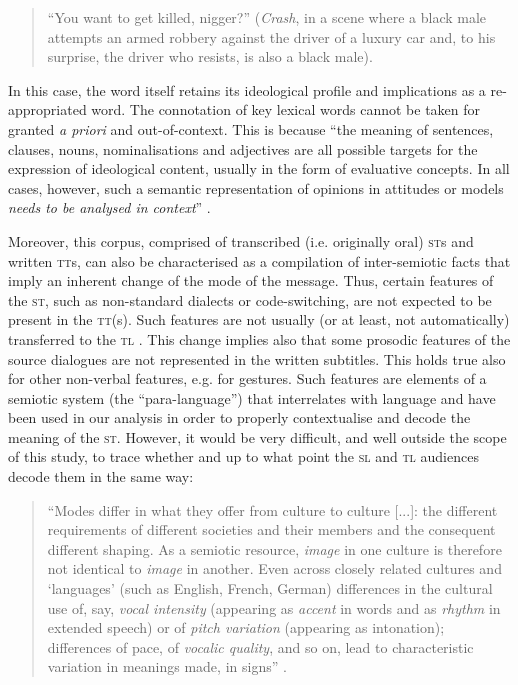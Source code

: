 \documentclass[output=paper]{LSP/langsci}
\begin{document}
\begin{quote}
 “You want to get killed, nigger?”\newline
\noindent (\textit{Crash}, in a scene where a black male attempts an armed robbery against the driver of a luxury car and, to his surprise, the driver who resists, is also a black male).
\end{quote}

In this case, the word itself retains its ideological profile and implications as a re-appropriated word. The connotation of key lexical words cannot be taken for granted \textit{a priori} and out-of-context. This is because “the meaning of sentences, clauses, nouns, nominalisations and adjectives are all possible targets for the expression of ideological content, usually in the form of evaluative concepts. In all cases, however, such a semantic representation of opinions in attitudes or models \textit{needs to be analysed in context}” \citep[260; our emphasis]{Dijk1995}.

Moreover, this corpus, comprised of transcribed (i.e. originally oral) \textsc{st}s and written \textsc{tt}s, can also be characterised as a compilation of inter-semiotic facts \citep{Jakobson2012} that imply an inherent change of the mode of the message. Thus, certain features of the \textsc{st}, such as non-standard dialects or code-switching, are not expected to be present in the \textsc{tt}(s). Such features are not usually (or at least, not automatically) transferred to the \textsc{tl} \citep[78]{Hatim1997}. This change implies also that some prosodic features of the source dialogues are not represented in the written subtitles. This holds true also for other non-verbal features, e.g. for gestures. Such features are elements of a semiotic system (the “para-language”) that interrelates with language \citep[32--42]{Halliday2014} and have been used in our analysis in order to properly contextualise and decode the meaning of the \textsc{st}. However, it would be very difficult, and well outside the scope of this study, to trace whether and up to what point the \textsc{sl} and \textsc{tl} audiences decode them in the same way:

\begin{quote}
“Modes differ in what they offer from culture to culture [...]: the different requirements of different societies and their members and the consequent different shaping. As a semiotic resource, \textit{image} in one culture is therefore not identical to \textit{image} in another. Even across closely related cultures and `languages' (such as English, French, German) differences in the cultural use of, say, \textit{vocal intensity} (appearing as \textit{accent} in words and as \textit{rhythm} in extended speech) or of \textit{pitch variation} (appearing as intonation); differences of pace, of \textit{vocalic quality}, and so on, lead to characteristic variation in meanings made, in signs” \citep[81; emphasis in the original]{Kress2010}.
\end{quote}
\end{document}
